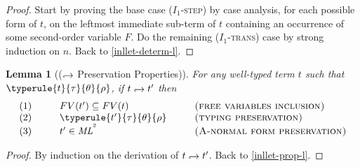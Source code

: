 \documentclass[a4paper,11pt,oneside]{article}
\theoremstyle{plain}
\newtheorem{lemma}[definition]{Lemma}
\newcommand{\inlsrc}{\textit{ML}^{^2}}
\newcommand{\inlT}{\inlsrc}
\newcommand{\hookdownarrow}{\mathrel{\rotatebox[origin=c]{180}{$\hookleftarrow$}}}
\newcommand{\inlletarr}{\hookdownarrow}
\newcommand{\inllet}[2]{#1 \hookdownarrow #2}
\begin{document}
\begin{proof}
Start by proving the base case (\textsc{$I_1$-step}) by case analysis, for each possible form of $t$, on the leftmost immediate sub-term of $t$ containing an occurrence of some second-order variable $F$. 
	  Do the remaining  (\textsc{$I_1$-trans}) case	by strong induction on $n$.  Back to \ref{inllet-determ-l}.
\end{proof}	
	
\begin{lemma}[($\inlletarr$ Preservation Properties)]
For any well-typed term $t$ such that\\ $\typerule{t}{\tau}{\theta}{\rho}$, if $\inllet{t}{t'}$ then
\begin{displaymath}
\begin{array}{l@{\hspace*{1cm}}l@{\hspace*{1cm}}l}
	(1)& FV(t') \subseteq FV(t) & \textsc{(free variables inclusion)} \\
	(2)& \typerule{t'}{\tau}{\theta}{\rho} &\textsc{(typing preservation)} \\
	(3)& t' \in \inlT & \textsc{(A-normal form preservation)}
\end{array}
\end{displaymath}
 \label{inllet-prop-p}
\end{lemma}

\begin{proof}
 By induction on the derivation of $\inllet{t}{t'}$.
 \label{TODO-inllet-prop-p}
 Back to \ref{inllet-prop-l}.
 \end{proof}	
	
\end{document}
